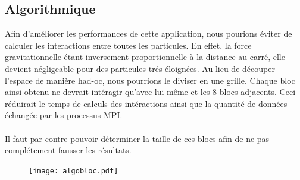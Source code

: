 \documentclass{article}
\begin{document}
\subsection{Algorithmique}
Afin d'améliorer les performances de cette application, nous pourions éviter de calculer les interactions entre toutes les particules. En effet, la force gravitationnelle étant inversement proportionnelle à la distance au carré, elle devient négligeable pour des particules trés éloignées. Au lieu de découper l'espace de manière had-oc, nous pourrions le diviser en une grille. Chaque bloc ainsi obtenu ne devrait intéragir qu'avec lui même et les 8 blocs adjacents. Ceci réduirait le temps de calculs des intéractions ainsi que la quantité de données échangée par les processus MPI.

\paragraph{} 
Il faut par contre pouvoir déterminer la taille de ces blocs afin de ne pas complétement fausser les résultats.

\begin{figure}[ht]
  \centering
  \texttt{[image: algobloc.pdf]}
  \caption{\label{fig:label} }
\end{figure}
\end{document}
